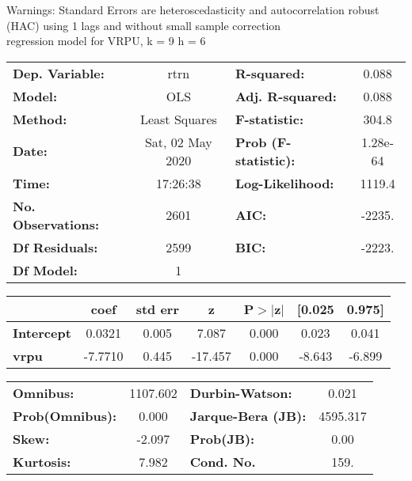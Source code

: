 Warnings: \newline
 [1] Standard Errors are heteroscedasticity and autocorrelation robust (HAC) using 1 lags and without small sample correction\\ 

regression model for VRPU, k = 9 h = 6\begin{center}
\begin{tabular}{lclc}
\toprule
\textbf{Dep. Variable:}    &       rtrn       & \textbf{  R-squared:         } &     0.088   \\
\textbf{Model:}            &       OLS        & \textbf{  Adj. R-squared:    } &     0.088   \\
\textbf{Method:}           &  Least Squares   & \textbf{  F-statistic:       } &     304.8   \\
\textbf{Date:}             & Sat, 02 May 2020 & \textbf{  Prob (F-statistic):} &  1.28e-64   \\
\textbf{Time:}             &     17:26:38     & \textbf{  Log-Likelihood:    } &    1119.4   \\
\textbf{No. Observations:} &        2601      & \textbf{  AIC:               } &    -2235.   \\
\textbf{Df Residuals:}     &        2599      & \textbf{  BIC:               } &    -2223.   \\
\textbf{Df Model:}         &           1      & \textbf{                     } &             \\
\bottomrule
\end{tabular}
\begin{tabular}{lcccccc}
                   & \textbf{coef} & \textbf{std err} & \textbf{z} & \textbf{P$> |$z$|$} & \textbf{[0.025} & \textbf{0.975]}  \\
\midrule
\textbf{Intercept} &       0.0321  &        0.005     &     7.087  &         0.000        &        0.023    &        0.041     \\
\textbf{vrpu}      &      -7.7710  &        0.445     &   -17.457  &         0.000        &       -8.643    &       -6.899     \\
\bottomrule
\end{tabular}
\begin{tabular}{lclc}
\textbf{Omnibus:}       & 1107.602 & \textbf{  Durbin-Watson:     } &    0.021  \\
\textbf{Prob(Omnibus):} &   0.000  & \textbf{  Jarque-Bera (JB):  } & 4595.317  \\
\textbf{Skew:}          &  -2.097  & \textbf{  Prob(JB):          } &     0.00  \\
\textbf{Kurtosis:}      &   7.982  & \textbf{  Cond. No.          } &     159.  \\
\bottomrule
\end{tabular}
\end{center}

